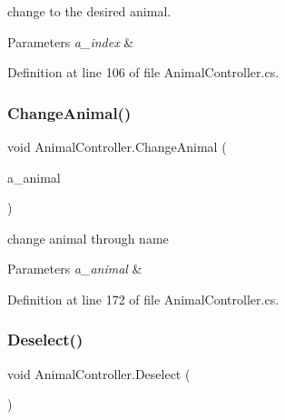 change to the desired animal. 


\begin{DoxyParams}{Parameters}
{\em a\+\_\+index} & \\
\hline
\end{DoxyParams}


Definition at line 106 of file Animal\+Controller.\+cs.

\mbox{\label{class_animal_controller_aac3d9d5df568e50019de0c8dd39245a3}} 
\subsubsection{\texorpdfstring{Change\+Animal()}{ChangeAnimal()}\hspace{0.1cm}{\footnotesize\ttfamily [3/3]}}
{\footnotesize\ttfamily void Animal\+Controller.\+Change\+Animal (\begin{DoxyParamCaption}\item[{\mbox{\hyperlink{_animal_8cs_a2fa5713399b84d1b88dae9196837af50}{A\+N\+I\+M\+A\+L\+\_\+\+N\+A\+ME}}}]{a\+\_\+animal }\end{DoxyParamCaption})}



change animal through name 


\begin{DoxyParams}{Parameters}
{\em a\+\_\+animal} & \\
\hline
\end{DoxyParams}


Definition at line 172 of file Animal\+Controller.\+cs.

\mbox{\label{class_animal_controller_a674f8d1c35dbc9a52357d80d192fc0c1}} 
\subsubsection{\texorpdfstring{Deselect()}{Deselect()}}
{\footnotesize\ttfamily void Animal\+Controller.\+Deselect (\begin{DoxyParamCaption}{ }\end{DoxyParamCaption})}



